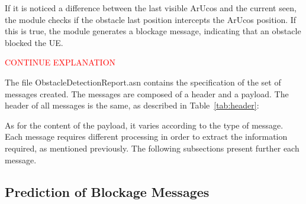 If it is noticed a difference between the last visible ArUcos and the current seen, the module checks if the obstacle last position intercepts the ArUcos position.
If this is true, the module generates a blockage message, indicating that an obstacle blocked the UE\@.

\textcolor{red}{CONTINUE EXPLANATION}



The file ObstacleDetectionReport.asn contains the specification of the set of messages created.
The messages are composed of a header and a payload.
The header of all messages is the same, as described in Table~\ref{tab:header}:


\begin{table}[H]
    \caption{Components of the Message Header}
    \label{tab:header}
    \centering
\end{table}

As for the content of the payload, it varies according to the type of message.
Each message requires different processing in order to extract the information required, as mentioned previously.
The following subsections present further each message.

\subsection{Prediction of Blockage Messages}

